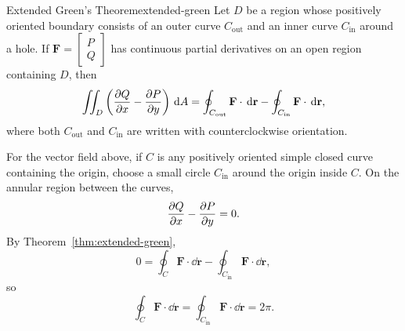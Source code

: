 \begin{theorem}{Extended Green's Theorem}{extended-green}
  Let $D$ be a region whose positively oriented boundary consists of an outer
  curve $C_{\text{out}}$ and an inner curve $C_{\text{in}}$ around a hole. If
  $\mathbf{F}=
    \begin{bmatrix}
      P \\Q
    \end{bmatrix}
  $ has continuous partial derivatives
  on an open region containing $D$, then
  \[
    \iint_D \left(\frac{\partial Q}{\partial x}-\frac{\partial P}{\partial y}\right)\,\mathrm{d}A
    =
    \oint_{C_{\text{out}}}\mathbf{F}\cdot\,\mathrm{d}\mathbf{r}
    -
    \oint_{C_{\text{in}}}\mathbf{F}\cdot\,\mathrm{d}\mathbf{r},
  \]
  where both $C_{\text{out}}$ and $C_{\text{in}}$ are written with
  counterclockwise orientation.
\end{theorem}

\begin{center}
\end{center}

\begin{example}

  For the vector field above, if $C$ is any positively oriented simple closed curve
  containing the origin, choose a small circle $C_{\text{in}}$ around the origin
  inside $C$. On the annular region between the curves,
  \[
    \frac{\partial Q}{\partial x}-\frac{\partial P}{\partial y}=0.
  \]
  By Theorem~\ref{thm:extended-green},
  \[
    0
    =
    \oint_C \mathbf{F}\cdot\dd{\mathbf{r}}
    -
    \oint_{C_{\text{in}}}\mathbf{F}\cdot\dd{\mathbf{r}},
  \]
  so
  \[
    \oint_C \mathbf{F}\cdot\dd{\mathbf{r}}
    =
    \oint_{C_{\text{in}}}\mathbf{F}\cdot\dd{\mathbf{r}}
    =
    2\pi.
  \]

\end{example}

